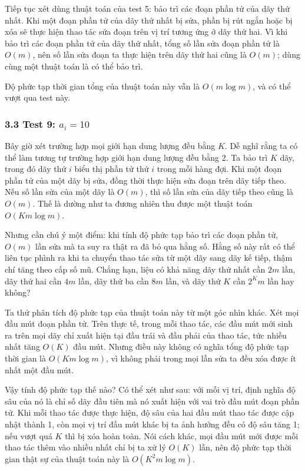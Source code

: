 \documentclass[11pt]{article}
\begin{document}
Tiếp tục xét dùng thuật toán của test 5: bảo trì các đoạn phần tử của dãy thứ
nhất. Khi một đoạn phần tử của dãy thứ nhất bị sửa, phần bị rút ngắn hoặc bị xóa
sẽ thực hiện thao tác sửa đoạn trên vị trí tương ứng ở dãy thứ hai. Vì khi bảo
trì các đoạn phần tử của dãy thứ nhất, tổng số lần sửa đoạn phần tử là \(O(m)\),
nên số lần sửa đoạn ta thực hiện trên dãy thứ hai cũng là \(O(m)\); dùng cùng
một thuật toán là có thể bảo trì.

Độ phức tạp thời gian tổng của thuật toán này vẫn là \(O(m\log m)\), và có thể
vượt qua test này.

\subsubsection*{3.3 Test 9: \(a_i=10\)}

Bây giờ xét trường hợp mọi giới hạn dung lượng đều bằng \(K\). Dễ nghĩ rằng ta
có thể làm tương tự trường hợp giới hạn dung lượng đều bằng 2. Ta bảo trì \(K\)
dãy, trong đó dãy thứ \(i\) biểu thị phần tử thứ \(i\) trong mỗi hàng đợi. Khi
một đoạn phần tử của một dãy bị sửa, đồng thời thực hiện sửa đoạn trên dãy tiếp
theo. Nếu số lần sửa của một dãy là \(O(m)\), thì số lần sửa của dãy tiếp theo
cũng là \(O(m)\). Thế là dường như ta đương nhiên thu được một thuật toán
\(O(Km\log m)\).

Nhưng cần chú ý một điểm: khi tính độ phức tạp bảo trì các đoạn phần tử, \(O(m)\)
lần sửa mà ta suy ra thật ra đã bỏ qua hằng số. Hằng số này rất có thể liên tục
phình ra khi ta chuyển thao tác sửa từ một dãy sang dãy kế tiếp, thậm chí tăng
theo cấp số mũ. Chẳng hạn, liệu có khả năng dãy thứ nhất cần \(2m\) lần, dãy thứ
hai cần \(4m\) lần, dãy thứ ba cần \(8m\) lần, và dãy thứ \(K\) cần \(2^K m\)
lần hay không?

Ta thử phân tích độ phức tạp của thuật toán này từ một góc nhìn khác. Xét mọi
đầu mút đoạn phần tử. Trên thực tế, trong mỗi thao tác, các đầu mút mới sinh ra
trên mọi dãy chỉ xuất hiện tại đầu trái và đầu phải của thao tác, tức nhiều nhất
tăng \(O(K)\) đầu mút. Nhưng điều này không có nghĩa tổng độ phức tạp thời gian
là \(O(Km\log m)\), vì không phải trong mọi lần sửa ta đều xóa được ít nhất một
đầu mút.

Vậy tính độ phức tạp thế nào? Có thể xét như sau: với mỗi vị trí, định nghĩa độ
sâu của nó là chỉ số dãy đầu tiên mà nó xuất hiện với vai trò đầu mút đoạn phần
tử. Khi mỗi thao tác được thực hiện, độ sâu của hai đầu mút thao tác được cập
nhật thành 1, còn mọi vị trí đầu mút khác bị ta ảnh hưởng đều có độ sâu tăng 1;
nếu vượt quá \(K\) thì bị xóa hoàn toàn. Nói cách khác, mọi đầu mút mới được
mỗi thao tác thêm vào nhiều nhất chỉ bị ta xử lý \(O(K)\) lần, nên độ phức tạp
thời gian thật sự của thuật toán này là \(O(K^2m\log m)\).
\end{document}
